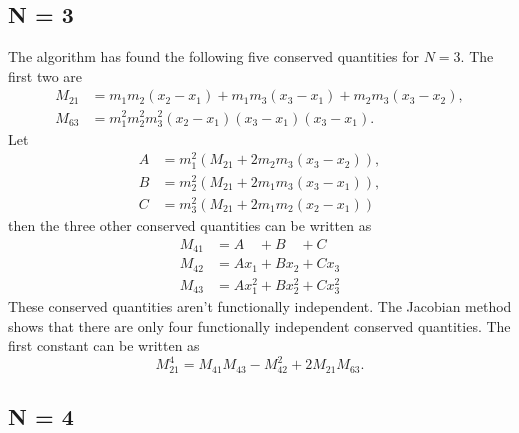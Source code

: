 \documentclass[english,master]{liumaiex}
\theoremstyle{plain}
\theoremstyle{definition}
\begin{document}
\subsection*{N = 3}

The algorithm has found the following five conserved quantities for $N = 3$.  The first two are
\begin{align}
	M_{21} &= m_1m_2(x_2 - x_1) + m_1m_3(x_3 - x_1) + m_2m_3(x_3 - x_2), \\
	M_{63} &= m_1^2m_2^2m_3^2(x_2 - x_1)(x_3 - x_1)(x_3 - x_1).
\end{align}
Let
\begin{align}
	A & = m_1^2(M_{21} + 2m_2m_3(x_3-x_2)), \\
	B & = m_2^2(M_{21} + 2m_1m_3(x_3-x_1)), \\
	C & = m_3^2(M_{21} + 2m_1m_2(x_2-x_1))
\end{align}
then the three other conserved quantities can be written as
\begin{align}
	M_{41} &= A\phantom{x_1} + B\phantom{x_2} + C\phantom{x_3} \\
	M_{42} &= Ax_1 + Bx_2 + Cx_3 \\
	M_{43} &= Ax_1^2 + Bx_2^2 + Cx_3^2
\end{align}
These conserved quantities aren't functionally independent. The Jacobian method shows that there are only four functionally independent conserved quantities. The first constant can be written as
\begin{equation}
	M_{21}^4 = M_{41}M_{43} - M_{42}^2 + 2M_{21}M_{63}.
\end{equation}

\subsection*{N = 4}
\end{document}
